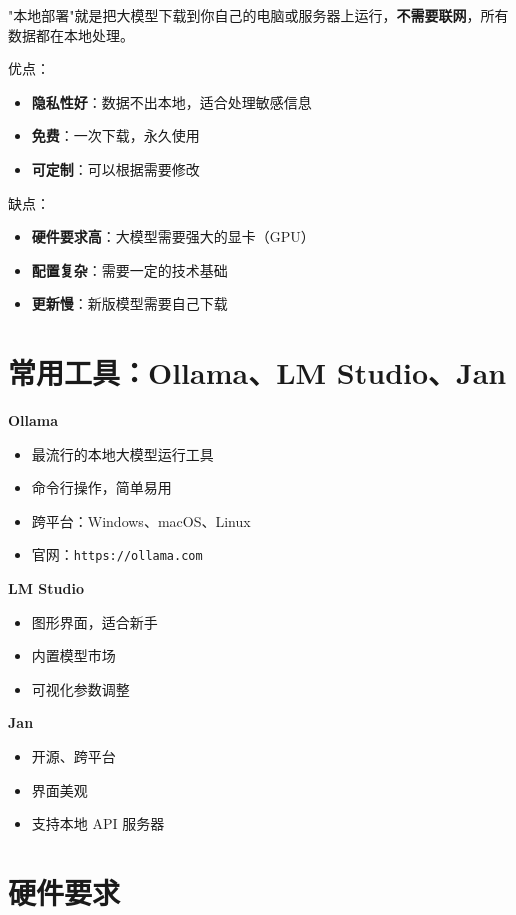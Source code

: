 \documentclass[12pt,UTF8]{ctexbook}
\begin{document}
"本地部署"就是把大模型下载到你自己的电脑或服务器上运行，\textbf{不需要联网}，所有数据都在本地处理。

优点：
\begin{itemize}
  \item \textbf{隐私性好}：数据不出本地，适合处理敏感信息
  \item \textbf{免费}：一次下载，永久使用
  \item \textbf{可定制}：可以根据需要修改
\end{itemize}

缺点：
\begin{itemize}
  \item \textbf{硬件要求高}：大模型需要强大的显卡（GPU）
  \item \textbf{配置复杂}：需要一定的技术基础
  \item \textbf{更新慢}：新版模型需要自己下载
\end{itemize}

\section{常用工具：Ollama、LM Studio、Jan}

\textbf{Ollama}
\begin{itemize}
  \item 最流行的本地大模型运行工具
  \item 命令行操作，简单易用
  \item 跨平台：Windows、macOS、Linux
  \item 官网：\texttt{https://ollama.com}
\end{itemize}

\textbf{LM Studio}
\begin{itemize}
  \item 图形界面，适合新手
  \item 内置模型市场
  \item 可视化参数调整
\end{itemize}

\textbf{Jan}
\begin{itemize}
  \item 开源、跨平台
  \item 界面美观
  \item 支持本地 API 服务器
\end{itemize}

\section{硬件要求}
\end{document}
